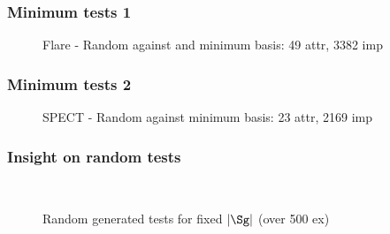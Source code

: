 \begin{frame}
\frametitle{Minimum tests 1}

\vspace{-1.5em}

\begin{figure}
	\centering
\scalebox{0.5}{}

\caption{Flare - Random against and minimum basis: 49 attr, 3382 imp}
\label{fig:barplot-flare}
\end{figure}

\end{frame}

\begin{frame}
\frametitle{Minimum tests 2}

\vspace{-1.5em}

\begin{figure}
	\centering
	\scalebox{0.5}{}
	
	\caption{SPECT - Random against minimum basis: 23 attr, 2169 imp}
	\label{fig:barplot-spect}
\end{figure}

\end{frame}

\begin{frame}[fragile]
\frametitle{Insight on random tests}

\vspace{0.5em}

\begin{figure}[H]
\begin{minipage}{0.4\paperwidth}
\hspace{-3em}
\subfloat[Average time, $|\Sg| = 100$]{
	\scalebox{0.4}{}
}
\end{minipage}
~
\begin{minipage}{0.4\paperwidth}
	\hspace{-1em}
\subfloat[Average time, $|\Sg| = 500$]{
	\scalebox{0.4}{}	
}
\end{minipage}

\caption{Random generated tests for fixed $|\Sg|$ (over 500 ex)}	
	
\end{figure}



\end{frame}

